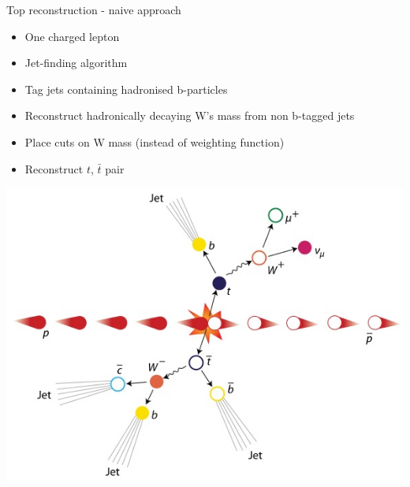 \documentclass{beamer}
\begin{document}
  \begin{frame}{Top reconstruction - naive approach}
    \begin{itemize}
      \item One charged lepton
      \item Jet-finding algorithm
      \item Tag jets containing hadronised b-particles 
      \item Reconstruct hadronically decaying W's mass from non b-tagged jets
      \item Place cuts on W mass (instead of weighting function)
      \item Reconstruct $t$, $\bar{t}$ pair
    \end{itemize}
    \includegraphics[height=0.4\textheight]{ttbar.jpg}
  \end{frame}
\end{document}
